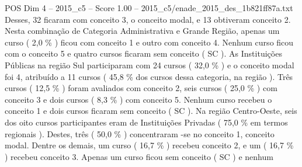 \begin{textsample}{POS Dim 4 – 2015\_c5 – Score 1.00 – 2015\_c5/enade\_2015\_des\_1b821ff87a.txt}
Desses, 32 ficaram com conceito 3, o conceito modal, e 13 obtiveram conceito 2.
Nesta combinação de Categoria Administrativa e Grande Região, apenas um curso ( 2,0 \% ) ficou com conceito 1 e outro com conceito 4.
Nenhum curso ficou com o conceito 5 e quatro cursos ficaram sem conceito ( SC ).
As Instituições Públicas na região Sul participaram com 24 cursos ( 32,0 \% ) e o conceito modal foi 4, atribuído a 11 cursos ( 45,8 \% dos cursos dessa categoria, na região ).
Três cursos ( 12,5 \% ) foram avaliados com conceito 2, seis cursos ( 25,0 \% ) com conceito 3 e dois cursos ( 8,3 \% ) com conceito 5.
Nenhum curso recebeu o conceito 1 e dois cursos ficaram sem conceito ( SC ).
Na região Centro-Oeste, seis dos oito cursos participantes eram de Instituições Privadas ( 75,0 \% em termos regionais ).
Destes, três ( 50,0 \% ) concentraram -se no conceito 1, conceito modal.
Dentre os demais, um curso ( 16,7 \% ) recebeu conceito 2, e um ( 16,7 \% ) recebeu conceito 3.
Apenas um curso ficou sem conceito ( SC ) e nenhum

\end{textsample}
